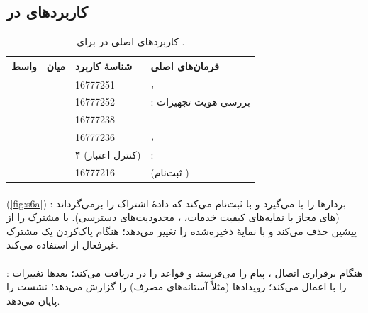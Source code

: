 \documentclass[11pt,a4paper]{article}
\begin{document}
\subsection{کاربردهای  در }
\begin{table}[htbp]
\centering\small
\caption{کاربردهای اصلی  در  برای .}\label{tab:apps}
\begin{tabularx}{\linewidth}{@{}l l l Y@{}}
\toprule
{}واسط & میان & شناسهٔ کاربرد & فرمان‌های اصلی \\
\midrule
{} &  & 16777251 & ،  \\
     &       & 16777252 & : بررسی هویت تجهیزات \\
      &     & 16777238 &  \\
      &       & 16777236 & ،  \\
      &      & ۴ (کنترل اعتبار) & :  \\
   &      & 16777216 &  (ثبت‌نام ) \\
\bottomrule
\end{tabularx}
\end{table}

\paragraph{} (\cref{fig:s6a}) \cite{ts29272}:  بردارها را با  می‌گیرد و با
 ثبت‌نام می‌کند که دادهٔ اشتراک را برمی‌گرداند (های مجاز با نمایه‌های کیفیت خدمات، ،
محدودیت‌های دسترسی).  با  مشترک را از  پیشین حذف می‌کند و با  نمایهٔ ذخیره‌شده
را تغییر می‌دهد؛  هنگام پاک‌کردن یک مشترک غیرفعال از  استفاده می‌کند.
\paragraph{} \cite{ts29212}: هنگام برقراری اتصال ،  پیام  را می‌فرستد و
قواعد  را در  دریافت می‌کند؛  بعدها تغییرات را با  اعمال می‌کند؛
 رویدادها (مثلاً آستانه‌های مصرف) را گزارش می‌دهد؛  نشست را پایان می‌دهد.
\end{document}
